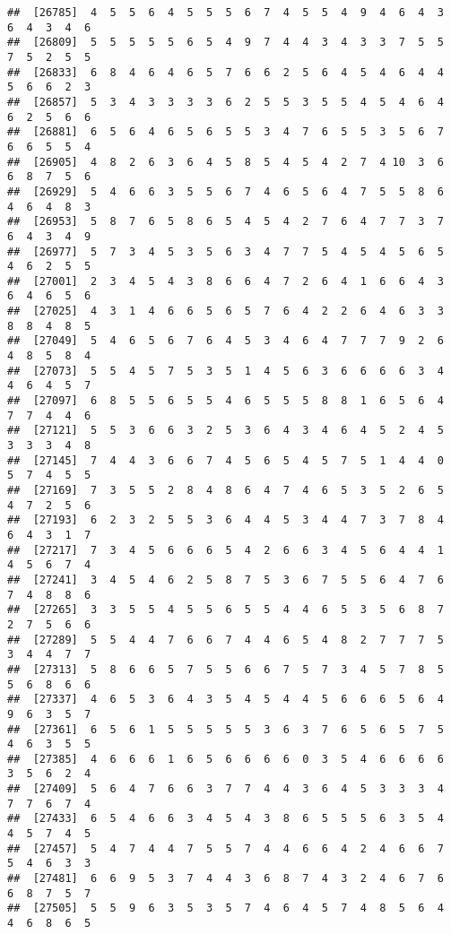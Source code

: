 \documentclass[
]{book}
\begin{document}
\begin{verbatim}
##  [26785]  4  5  5  6  4  5  5  5  6  7  4  5  5  4  9  4  6  4  3  6  4  3  4  6
##  [26809]  5  5  5  5  5  6  5  4  9  7  4  4  3  4  3  3  7  5  5  7  5  2  5  5
##  [26833]  6  8  4  6  4  6  5  7  6  6  2  5  6  4  5  4  6  4  4  5  6  6  2  3
##  [26857]  5  3  4  3  3  3  3  6  2  5  5  3  5  5  4  5  4  6  4  6  2  5  6  6
##  [26881]  6  5  6  4  6  5  6  5  5  3  4  7  6  5  5  3  5  6  7  6  6  5  5  4
##  [26905]  4  8  2  6  3  6  4  5  8  5  4  5  4  2  7  4 10  3  6  6  8  7  5  6
##  [26929]  5  4  6  6  3  5  5  6  7  4  6  5  6  4  7  5  5  8  6  4  6  4  8  3
##  [26953]  5  8  7  6  5  8  6  5  4  5  4  2  7  6  4  7  7  3  7  6  4  3  4  9
##  [26977]  5  7  3  4  5  3  5  6  3  4  7  7  5  4  5  4  5  6  5  4  6  2  5  5
##  [27001]  2  3  4  5  4  3  8  6  6  4  7  2  6  4  1  6  6  4  3  6  4  6  5  6
##  [27025]  4  3  1  4  6  6  5  6  5  7  6  4  2  2  6  4  6  3  3  8  8  4  8  5
##  [27049]  5  4  6  5  6  7  6  4  5  3  4  6  4  7  7  7  9  2  6  4  8  5  8  4
##  [27073]  5  5  4  5  7  5  3  5  1  4  5  6  3  6  6  6  6  3  4  4  6  4  5  7
##  [27097]  6  8  5  5  6  5  5  4  6  5  5  5  8  8  1  6  5  6  4  7  7  4  4  6
##  [27121]  5  5  3  6  6  3  2  5  3  6  4  3  4  6  4  5  2  4  5  3  3  3  4  8
##  [27145]  7  4  4  3  6  6  7  4  5  6  5  4  5  7  5  1  4  4  0  5  7  4  5  5
##  [27169]  7  3  5  5  2  8  4  8  6  4  7  4  6  5  3  5  2  6  5  4  7  2  5  6
##  [27193]  6  2  3  2  5  5  3  6  4  4  5  3  4  4  7  3  7  8  4  6  4  3  1  7
##  [27217]  7  3  4  5  6  6  6  5  4  2  6  6  3  4  5  6  4  4  1  4  5  6  7  4
##  [27241]  3  4  5  4  6  2  5  8  7  5  3  6  7  5  5  6  4  7  6  7  4  8  8  6
##  [27265]  3  3  5  5  4  5  5  6  5  5  4  4  6  5  3  5  6  8  7  2  7  5  6  6
##  [27289]  5  5  4  4  7  6  6  7  4  4  6  5  4  8  2  7  7  7  5  3  4  4  7  7
##  [27313]  5  8  6  6  5  7  5  5  6  6  7  5  7  3  4  5  7  8  5  5  6  8  6  6
##  [27337]  4  6  5  3  6  4  3  5  4  5  4  4  5  6  6  6  5  6  4  9  6  3  5  7
##  [27361]  6  5  6  1  5  5  5  5  5  3  6  3  7  6  5  6  5  7  5  4  6  3  5  5
##  [27385]  4  6  6  6  1  6  5  6  6  6  6  0  3  5  4  6  6  6  6  3  5  6  2  4
##  [27409]  5  6  4  7  6  6  3  7  7  4  4  3  6  4  5  3  3  3  4  7  7  6  7  4
##  [27433]  6  5  4  6  6  3  4  5  4  3  8  6  5  5  5  6  3  5  4  4  5  7  4  5
##  [27457]  5  4  7  4  4  7  5  5  7  4  4  6  6  4  2  4  6  6  7  5  4  6  3  3
##  [27481]  6  6  9  5  3  7  4  4  3  6  8  7  4  3  2  4  6  7  6  6  8  7  5  7
##  [27505]  5  5  9  6  3  5  3  5  7  4  6  4  5  7  4  8  5  6  4  4  6  8  6  5

\end{verbatim}
\end{document}
